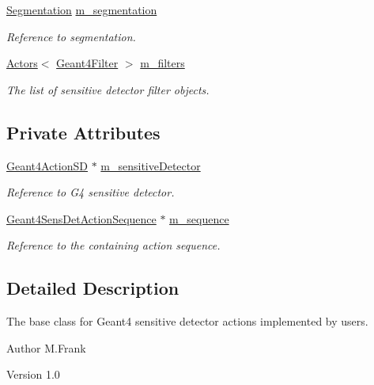 \begin{DoxyCompactItemize}
\hyperlink{class_d_d4hep_1_1_geometry_1_1_segmentation}{Segmentation} \hyperlink{class_d_d4hep_1_1_simulation_1_1_geant4_sensitive_ab7817460de763632e629982ca4c2c847}{m\_\-segmentation}
\begin{DoxyCompactList}\small\item\em Reference to segmentation. \item\end{DoxyCompactList}\item 
\hyperlink{class_d_d4hep_1_1_simulation_1_1_geant4_action_1_1_actors}{Actors}$<$ \hyperlink{class_d_d4hep_1_1_simulation_1_1_geant4_filter}{Geant4Filter} $>$ \hyperlink{class_d_d4hep_1_1_simulation_1_1_geant4_sensitive_a7486440af0fb52c3ab233544262d2c95}{m\_\-filters}
\begin{DoxyCompactList}\small\item\em The list of sensitive detector filter objects. \item\end{DoxyCompactList}\end{DoxyCompactItemize}
\subsection*{Private Attributes}
\begin{DoxyCompactItemize}
\item 
\hyperlink{class_d_d4hep_1_1_simulation_1_1_geant4_action_s_d}{Geant4ActionSD} $\ast$ \hyperlink{class_d_d4hep_1_1_simulation_1_1_geant4_sensitive_afc56b9a8666f9fe594516436f7fdd4e0}{m\_\-sensitiveDetector}
\begin{DoxyCompactList}\small\item\em Reference to G4 sensitive detector. \item\end{DoxyCompactList}\item 
\hyperlink{class_d_d4hep_1_1_simulation_1_1_geant4_sens_det_action_sequence}{Geant4SensDetActionSequence} $\ast$ \hyperlink{class_d_d4hep_1_1_simulation_1_1_geant4_sensitive_a7c98977dbb602b8053f21ff8e36f925d}{m\_\-sequence}
\begin{DoxyCompactList}\small\item\em Reference to the containing action sequence. \item\end{DoxyCompactList}\end{DoxyCompactItemize}


\subsection{Detailed Description}
The base class for Geant4 sensitive detector actions implemented by users. \begin{DoxyAuthor}{Author}
M.Frank 
\end{DoxyAuthor}
\begin{DoxyVersion}{Version}
1.0 
\end{DoxyVersion}


